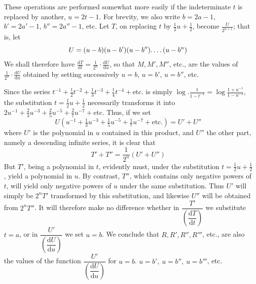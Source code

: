 These operations are performed somewhat more easily if the indeterminate $t$ is replaced by another, $u=2t-1$. For brevity, we also write $b=2a-1$, $b'=2a'-1$, $b''=2a''-1$, etc. Let $T$, on replacing $t$ by $\tfrac12u+\tfrac12$, become $\frac{U}{2^{n+1}}$; that is, let
\[
U=(u-b)(u-b')(u-b'')\ldotp\ldotp\ldotp\ldotp(u-b^n)
\]
We shall therefore have $\frac{\mathrm{d}T}{\mathrm{d}t}=\frac{1}{2^n}\cdot\frac{\mathrm{d}U}{\mathrm{d}u}$, so that $M,M',M''$, etc., are the values of $\frac{1}{2^n}\cdot\frac{\mathrm{d}U}{\mathrm{d}u}$ obtained by setting successively $u=b$, $u=b'$, $u=b''$, etc.

Since the series $t^{-1}+\tfrac12t^{-2}+\tfrac13t^{-3}+\tfrac14t^{-4}+\text{etc.}$ is simply $\log.\frac{1}{1-t^{-1}}=\log\frac{1+u^{-1}}{1-u^{-1}}$, the substitution $t=\tfrac12u+\tfrac12$ necessarily transforms it into $2u^{-1}+\tfrac23u^{-3}+\tfrac25u^{-5}+\tfrac27u^{-7}+\text{etc.}$ Thus, if we set
\[
U(u^{-1}+\tfrac13u^{-3}+\tfrac15u^{-5}+\tfrac17u^{-7}+\text{etc.})=U'+U''
\]
where $U'$ is the polynomial in $u$ contained in this product, and $U''$ the other part, namely a descending infinite series, it is clear that
\[
T'+T''=\frac{1}{2^n}(U'+U'')
\]
But $T'$, being a polynomial in $t$, evidently must, under the substitution $t=\tfrac12u+\tfrac12$, yield a polynomial in $u$. By contrast, $T''$, which contains only negative powers of $t$, will yield only negative powers of $u$ under the same substitution. Thus $U'$ will simply be $2^nT'$ transformed by this substitution, and likewise $U''$ will be obtained from $2^nT''$. It will therefore make no difference whether in $\dfrac{T'}{\left(\dfrac{\mathrm{d}T}{\mathrm{d}t}\right)}$ we substitute $t=a$, or in $\dfrac{U'}{\left(\dfrac{\mathrm{d}U}{\mathrm{d}u}\right)}$ we set $u=b$. We conclude that $R, R', R'', R'''$, etc., are also the values of the function $\dfrac{U'}{\left(\dfrac{\mathrm{d}U}{\mathrm{d}u}\right)}$ for $u=b$. $u=b',\ u=b'',\ u=b'''$, etc.

